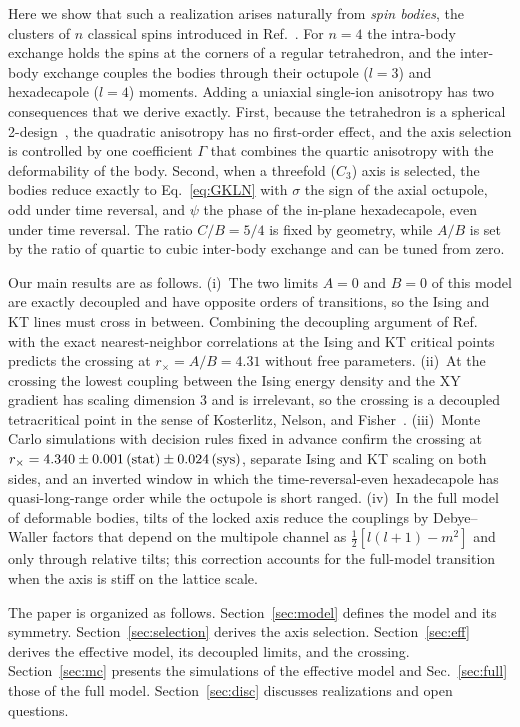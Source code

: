 \documentclass[pre,reprint,superscriptaddress,longbibliography,amsmath,amssymb,floatfix]{revtex4-2}
\begin{document}
Here we show that such a realization arises naturally from \emph{spin bodies}, the clusters of $n$ classical spins introduced in Ref.~\cite{PaperI}. For $n=4$ the intra-body exchange holds the spins at the corners of a regular tetrahedron, and the inter-body exchange couples the bodies through their octupole ($l=3$) and hexadecapole ($l=4$) moments. Adding a uniaxial single-ion anisotropy has two consequences that we derive exactly. First, because the tetrahedron is a spherical 2-design~\cite{Delsarte1977}, the quadratic anisotropy has no first-order effect, and the axis selection is controlled by one coefficient $\Gamma$ that combines the quartic anisotropy with the deformability of the body. Second, when a threefold ($C_3$) axis is selected, the bodies reduce exactly to Eq.~\eqref{eq:GKLN} with $\sigma$ the sign of the axial octupole, odd under time reversal, and $\psi$ the phase of the in-plane hexadecapole, even under time reversal. The ratio $C/B=5/4$ is fixed by geometry, while $A/B$ is set by the ratio of quartic to cubic inter-body exchange and can be tuned from zero.

Our main results are as follows.
(i)~The two limits $A=0$ and $B=0$ of this model are exactly decoupled and have opposite orders of transitions, so the Ising and KT lines must cross in between. Combining the decoupling argument of Ref.~\cite{YosefinDomany1985} with the exact nearest-neighbor correlations at the Ising and KT critical points predicts the crossing at $r_\times=A/B=4.31$ without free parameters.
(ii)~At the crossing the lowest coupling between the Ising energy density and the XY gradient has scaling dimension 3 and is irrelevant, so the crossing is a decoupled tetracritical point in the sense of Kosterlitz, Nelson, and Fisher~\cite{KNF1976}.
(iii)~Monte Carlo simulations with decision rules fixed in advance confirm the crossing at $r_\times=4.340\pm0.001\,({\rm stat})\pm0.024\,({\rm sys})$, separate Ising and KT scaling on both sides, and an inverted window in which the time-reversal-even hexadecapole has quasi-long-range order while the octupole is short ranged.
(iv)~In the full model of deformable bodies, tilts of the locked axis reduce the couplings by Debye--Waller factors that depend on the multipole channel as $\frac12[l(l+1)-m^2]$ and only through relative tilts; this correction accounts for the full-model transition when the axis is stiff on the lattice scale.

The paper is organized as follows. Section~\ref{sec:model} defines the model and its symmetry. Section~\ref{sec:selection} derives the axis selection. Section~\ref{sec:eff} derives the effective model, its decoupled limits, and the crossing. Section~\ref{sec:mc} presents the simulations of the effective model and Sec.~\ref{sec:full} those of the full model. Section~\ref{sec:disc} discusses realizations and open questions.
\end{document}
